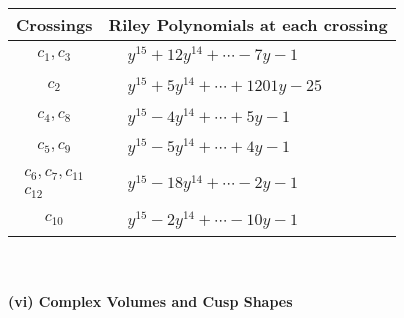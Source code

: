 \documentclass[1p]{elsarticle_modified}
\theoremstyle{definition}
\begin{document}
\begin{tabular}{m{50pt}|m{274pt}}
Crossings & \hspace{64pt}Riley Polynomials at each crossing \\
\hline $$\begin{aligned}c_{1},c_{3}\end{aligned}$$&$\begin{aligned}
&y^{15}+12 y^{14}+\cdots-7 y-1
\end{aligned}$\\
\hline $$\begin{aligned}c_{2}\end{aligned}$$&$\begin{aligned}
&y^{15}+5 y^{14}+\cdots+1201 y-25
\end{aligned}$\\
\hline $$\begin{aligned}c_{4},c_{8}\end{aligned}$$&$\begin{aligned}
&y^{15}-4 y^{14}+\cdots+5 y-1
\end{aligned}$\\
\hline $$\begin{aligned}c_{5},c_{9}\end{aligned}$$&$\begin{aligned}
&y^{15}-5 y^{14}+\cdots+4 y-1
\end{aligned}$\\
\hline $$\begin{aligned}c_{6},c_{7},c_{11}\\c_{12}\end{aligned}$$&$\begin{aligned}
&y^{15}-18 y^{14}+\cdots-2 y-1
\end{aligned}$\\
\hline $$\begin{aligned}c_{10}\end{aligned}$$&$\begin{aligned}
&y^{15}-2 y^{14}+\cdots-10 y-1
\end{aligned}$\\
\hline
\end{tabular}\\~\\
\newpage\flushleft \textbf{(vi) Complex Volumes and Cusp Shapes}
\end{document}
